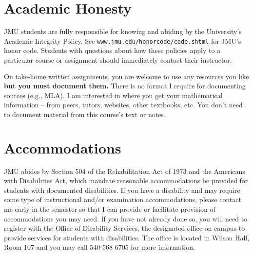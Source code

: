 \documentclass[margin,line,pifont,palatino,courier]{res}
\begin{document}
\begin{resume}
\section{\sc Academic Honesty} %

JMU students are fully responsible for knowing and abiding by the University's Academic Integrity Policy.  See \verb+www.jmu.edu/honorcode/code.shtml+ for JMU's honor code. Students with questions about how these policies apply to a particular course or assignment should immediately contact their instructor.

On take-home written assignments, you are welcome to use any resources you like \textbf{but you must document them.}  There is no format I require for documenting sources (e.g., MLA).  I am interested in where you get your mathematical information -- from peers, tutors, websites, other textbooks, etc.  You don't need to document material from this course's text or notes. 

\newpage
\section{\sc Accommodations} JMU abides by Section 504 of the Rehabilitation Act of 1973 and the Americans with Disabilities Act, which mandate reasonable accommodations be provided for students with documented disabilities. If you have a disability and may require some type of instructional and/or examination accommodations, please contact me early in the semester so that I can provide or facilitate provision of accommodations you may need. If you have not already done so, you will need to register with the Office of Disability Services, the designated office on campus to provide services for students with disabilities. The office is located in Wilson Hall, Room 107 and you may call 540-568-6705 for more information.



\end{resume}
\end{document}
